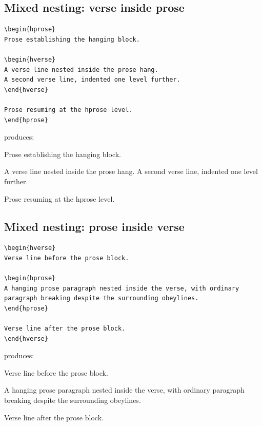 \documentclass[11pt, twoside, openany]{article}
\begin{document}
\subsection*{Mixed nesting: verse inside prose}

\begin{verbatim}
\begin{hprose}
Prose establishing the hanging block.

\begin{hverse}
A verse line nested inside the prose hang.
A second verse line, indented one level further.
\end{hverse}

Prose resuming at the hprose level.
\end{hprose}
\end{verbatim}

\noindent produces:

\begin{hprose}
Prose establishing the hanging block. \lipsum[15][1-2]

\begin{hverse}
A verse line nested inside the prose hang.
A second verse line, indented one level further.
\end{hverse}

Prose resuming at the hprose level. \lipsum[16][1-2]
\end{hprose}

\subsection*{Mixed nesting: prose inside verse}

\begin{verbatim}
\begin{hverse}
Verse line before the prose block.

\begin{hprose}
A hanging prose paragraph nested inside the verse, with ordinary
paragraph breaking despite the surrounding obeylines.
\end{hprose}

Verse line after the prose block.
\end{hverse}
\end{verbatim}

\noindent produces:

\begin{hverse}
Verse line before the prose block.

\begin{hprose}
A hanging prose paragraph nested inside the verse, with ordinary
paragraph breaking despite the surrounding obeylines.
\lipsum[17][1-2]
\end{hprose}

Verse line after the prose block.
\end{hverse}
\end{document}

